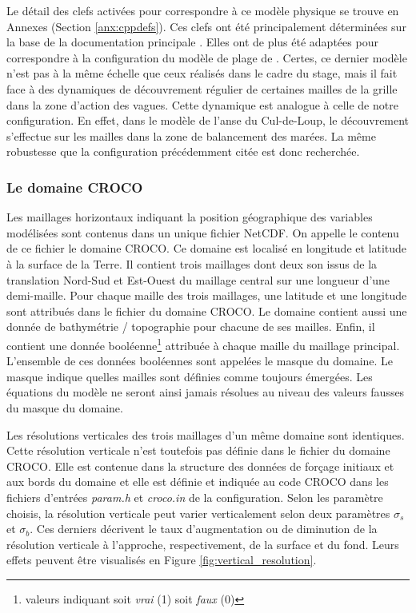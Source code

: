 \documentclass[10pt,a4paper,titlepage]{article}
\begin{document}
Le détail des clefs activées pour correspondre à ce modèle physique se trouve en Annexes (Section \ref{anx:cppdefs}).
Ces clefs ont été principalement déterminées sur la base de la documentation principale \cite{cppkeys_description}.
Elles ont de plus été adaptées pour correspondre à la configuration du modèle de plage de  \cite[Marchesiello et al. (2021)][ ]{swash_article_MARCHESIELLO2021101816}.
Certes, ce dernier modèle n'est pas à la même échelle que ceux réalisés dans le cadre du stage, mais il fait face à des dynamiques de découvrement régulier de certaines mailles de la grille dans la zone d'action des vagues.
Cette dynamique est analogue à celle de notre configuration.
En effet, dans le modèle de l'anse du Cul-de-Loup, le découvrement s'effectue sur les mailles dans la zone de balancement des marées.
La même robustesse que la configuration précédemment citée est donc recherchée.


\subsubsection{Le domaine CROCO}
\label{subsub:grille_croco}
Les maillages horizontaux indiquant la position géographique des variables modélisées sont contenus dans un unique fichier NetCDF.
On appelle le contenu de ce fichier le domaine CROCO.
Ce domaine est localisé en longitude et latitude à la surface de la Terre.
Il contient trois maillages dont deux son issus de la translation Nord-Sud et Est-Ouest du maillage central sur une longueur d'une demi-maille.
Pour chaque maille des trois maillages, une latitude et une longitude sont attribués dans le fichier du domaine CROCO.
Le domaine contient aussi une donnée de bathymétrie / topographie pour chacune de ses mailles.
Enfin, il contient une donnée booléenne\footnote{valeurs indiquant soit \textit{vrai} (1) soit \textit{faux} (0)} attribuée à chaque maille du maillage principal.
L'ensemble de ces données booléennes sont appelées le masque du domaine.
Le masque indique quelles mailles sont définies comme toujours émergées.
Les équations du modèle ne seront ainsi jamais résolues au niveau des valeurs fausses du masque du domaine.

Les résolutions verticales des trois maillages d'un même domaine sont identiques.
Cette résolution verticale n'est toutefois pas définie dans le fichier du domaine CROCO.
Elle est contenue dans la structure des données de forçage initiaux et aux bords du domaine et elle est définie et indiquée au code CROCO dans les fichiers d'entrées \textit{param.h} et \textit{croco.in} de la configuration.
Selon les paramètre choisis, la résolution verticale peut varier verticalement selon deux paramètres $\sigma_{s}$ et $\sigma_{b}$.
Ces derniers décrivent le taux d'augmentation ou de diminution de la résolution verticale à l'approche, respectivement, de la surface et du fond.
Leurs effets peuvent être visualisés en Figure \ref{fig:vertical_resolution}.
\end{document}
